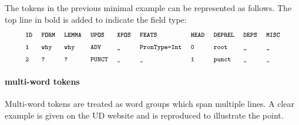 The tokens in the previous minimal example can be represented as follows. The top line in bold is added to indicate the field type:
\begin{align*}
\conllu{\textbf{ID}}\tab\conllu{\textbf{FORM}}\tab\conllu{\textbf{LEMMA}}\tab\conllu{\textbf{UPOS}}\tab\conllu{\textbf{XPOS}}\tab\conllu{\textbf{FEATS}}\tab\conllu{\textbf{HEAD}}\tab\conllu{\textbf{DEPREL}}\tab\conllu{\textbf{DEPS}}\tab\conllu{\textbf{MISC}}\\
\conllu{1}\tab\conllu{why}\tab\conllu{why}\tab\conllu{ADV}\tab\conllu{\_}\tab\conllu{PronType=Int}\tab\conllu{0}\tab\conllu{root}\tab\conllu{\_}\tab\conllu{\_}\\
\conllu{2}\tab\conllu{?}\tab\conllu{?}\tab\conllu{PUNCT}\tab\conllu{\_}\tab\conllu{\_}\tab\conllu{1}\tab\conllu{punct}\tab\conllu{\_}\tab\conllu{\_}
\end{align*}

\paragraph{multi-word tokens}
Multi-word tokens are treated as word groups which span multiple lines. A clear example is given on the UD website and is reproduced to illustrate the point.





